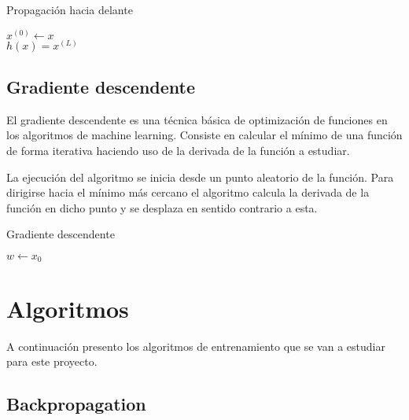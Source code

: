 \begin{algorithm}[H]
   \caption{Propagación hacia delante}
   
   $x^{(0)} \gets x$ \\
   $h(x) = x^{(L)}$
   \label{tab:Feedforward}
\end{algorithm}

\subsection{Gradiente descendente}

El gradiente descendente es una técnica básica de optimización de funciones en los algoritmos de machine learning. Consiste en calcular el mínimo de una función de forma iterativa haciendo uso de la derivada de la función a estudiar. 

La ejecución del algoritmo se inicia desde un punto aleatorio de la función. Para dirigirse hacia el mínimo más cercano el algoritmo calcula la derivada de la función en dicho punto y se desplaza en sentido contrario a esta. 

\begin{algorithm}[H]
   \caption{Gradiente descendente}
   $w \gets x_{0}$\\
\end{algorithm}
\newpage 
\section{Algoritmos}

A continuación presento los algoritmos de entrenamiento que se van a estudiar para este proyecto.

\subsection{Backpropagation} \label{tab:Backprop}

